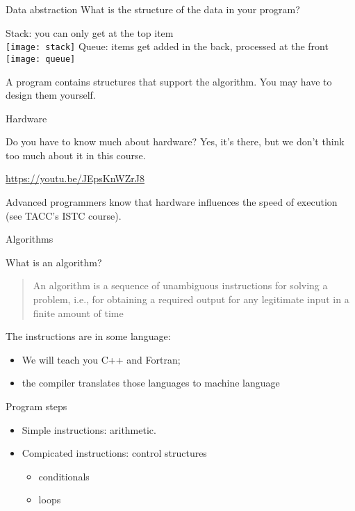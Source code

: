 \begin{block}{Data abstraction}
  \label{sl:stackabstract}
  What is the structure of the data in your program?

  \begin{multicols}{2}
    Stack: you can only get at the top item\\

    \texttt{[image: stack]}
    \vfill\columnbreak
    Queue: items get added in the back, processed at the front\\

    \texttt{[image: queue]}
  \end{multicols}
  A program contains structures that support the algorithm. You may
  have to design them yourself.
\end{block}

 {Hardware}

\begin{block}{Do you have to know much about hardware?}
  \label{sl:hardwarevid}
  Yes, it's there, but we don't think too much about it in this course.

  \url{https://youtu.be/JEpsKnWZrJ8}

  Advanced programmers know that hardware influences the speed of
  execution (see TACC's ISTC course).
\end{block}

 {Algorithms}

\begin{block}{What is an algorithm?}
  \label{sl:whatalgo}
  \begin{quotation}
    An algorithm is a sequence of unambiguous instructions for solving
    a problem, i.e., for obtaining a required output for any
    legitimate input in a finite amount of time\\
  \end{quotation}
  The instructions are in some language:
  \begin{itemize}
  \item We will teach you C++ and Fortran;
  \item the compiler translates those languages to machine language
  \end{itemize}
\end{block}

\begin{block}{Program steps}
  \label{sl:step-by-step}
  \begin{itemize}
  \item Simple instructions: arithmetic.
  \item Compicated instructions: control structures
    \begin{itemize}
    \item conditionals
    \item loops
    \end{itemize}
  \end{itemize}
\end{block}

